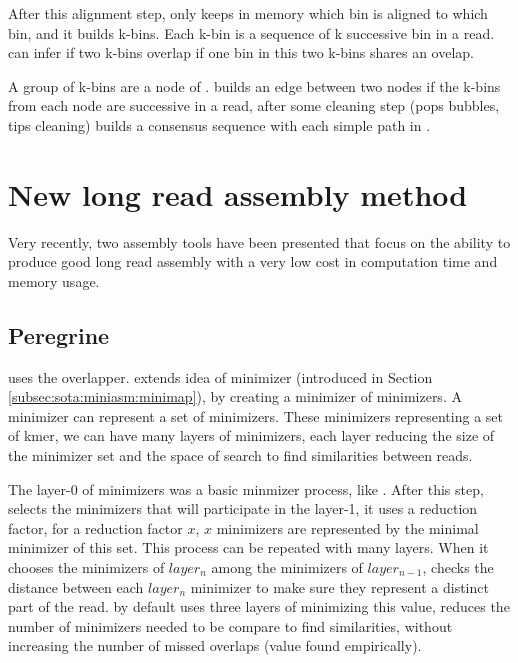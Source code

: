\documentclass[main]{subfiles}
\begin{document}
After this alignment step, \wtdbg only keeps in memory which bin is aligned to which bin, and it builds k-bins. Each k-bin is a sequence of k successive bin in a read. \wtdbg can infer if two k-bins overlap if one bin in this two k-bins shares an ovelap.

A group of k-bins are a node of . \wtdbg builds an edge between two nodes if the k-bins from each node are successive in a read, after some cleaning step (pops bubbles, tips cleaning) \wtdbg builds a consensus sequence with each simple path in .

\section{New long read assembly method}

Very recently, two assembly tools have been presented that focus on the ability to produce good long read assembly with a very low cost in computation time and memory usage.

\subsection{Peregrine}

\newcommand{\shimmer}{}

\peregrine \cite{Peregrine} uses the \shimmer overlapper. \shimmer extends idea of minimizer (introduced in Section \ref{subsec:sota:miniasm:minimap}), by creating a minimizer of minimizers. A minimizer can represent a set of minimizers. These minimizers representing a set of kmer, we can have many layers of minimizers, each layer reducing the size of the minimizer set and the space of search to find similarities between reads.

The layer-0 of minimizers was a basic minmizer process, like \minimap. After this step, \shimmer selects the minimizers that will participate in the layer-1, it uses a reduction factor, for a reduction factor $x$, $x$ minimizers are represented by the minimal minimizer of this set. This process can be repeated with many layers. When it chooses the minimizers of $layer_n$ among the minimizers of $layer_{n-1}$, \shimmer checks the distance between each $layer_n$ minimizer to make sure they represent a distinct part of the read. \shimmer by default uses three layers of minimizing \otherp{}this value, reduces the number of minimizers needed to be compare to find similarities, without increasing the number of missed overlaps (value found empirically).
\end{document}
